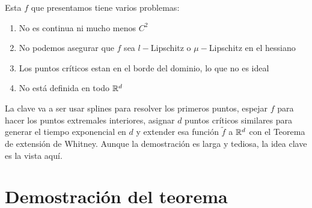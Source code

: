 \begin{remark}
	Esta $f$ que presentamos tiene varios problemas:
	
	\begin{enumerate}
		\item No es continua ni mucho menos $C^2$
		\item No podemos asegurar que $f$ sea $l-$Lipschitz o $\mu-$Lipschitz en el hessiano
		\item Los puntos cr\'iticos estan en el borde del dominio, lo que no es ideal
		\item No est\'a definida en todo ${\mathbb{R}}^d$
	\end{enumerate}
	
	La clave va a ser usar splines para resolver los primeros puntos, espejar $f$ para hacer los puntos extremales interiores, asignar $d$ puntos cr\'iticos similares para generar el tiempo exponencial en $d$ y extender esa funci\'on $\tilde{f}$ a ${\mathbb{R}}^d$ con el Teorema de extensi\'on de Whitney. Aunque la demostraci\'on es larga y tediosa, la idea clave es la vista aqu\'i.
\end{remark}

\section{Demostraci\'on del teorema}


